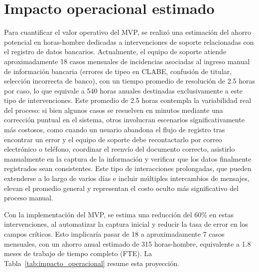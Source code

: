 \section{Impacto operacional estimado}

Para cuantificar el valor operativo del MVP, se realizó una estimación del ahorro potencial en horas-hombre dedicadas a intervenciones de soporte relacionadas con el registro de datos bancarios. Actualmente, el equipo de soporte atiende aproximadamente 18 casos mensuales de incidencias asociadas al ingreso manual de información bancaria (errores de tipeo en CLABE, confusión de titular, selección incorrecta de banco), con un tiempo promedio de resolución de 2.5 horas por caso, lo que equivale a 540 horas anuales destinadas exclusivamente a este tipo de intervenciones. Este promedio de 2.5 horas contempla la variabilidad real del proceso: si bien algunos casos se resuelven en minutos mediante una corrección puntual en el sistema, otros involucran escenarios significativamente más costosos, como cuando un usuario abandona el flujo de registro tras encontrar un error y el equipo de soporte debe recontactarlo por correo electrónico o teléfono, coordinar el reenvío del documento correcto, asistirlo manualmente en la captura de la información y verificar que los datos finalmente registrados sean consistentes. Este tipo de interacciones prolongadas, que pueden extenderse a lo largo de varios días e incluir múltiples intercambios de mensajes, elevan el promedio general y representan el costo oculto más significativo del proceso manual.

Con la implementación del MVP, se estima una reducción del 60\% en estas intervenciones, al automatizar la captura inicial y reducir la tasa de error en los campos críticos. Esto implicaría pasar de 18 a aproximadamente 7 casos mensuales, con un ahorro anual estimado de 315 horas-hombre, equivalente a 1.8 meses de trabajo de tiempo completo (FTE). La Tabla~\ref{tab:impacto_operacional} resume esta proyección.

\begin{table}[H]
\centering
{}
\caption{Reducción estimada de intervenciones de soporte}
\label{tab:impacto_operacional}
\end{table}

